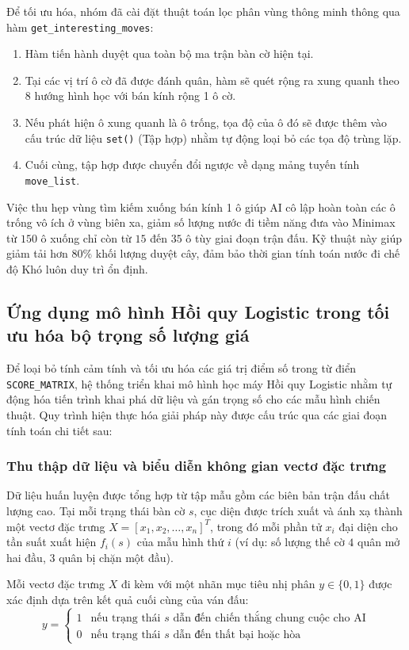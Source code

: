 Để tối ưu hóa, nhóm đã cài đặt thuật toán lọc phân vùng thông minh thông qua hàm \texttt{get\_interesting\_moves}:
\begin{enumerate}
	\item Hàm tiến hành duyệt qua toàn bộ ma trận bàn cờ hiện tại.
	\item Tại các vị trí ô cờ đã được đánh quân, hàm sẽ quét rộng ra xung quanh theo 8 hướng hình học với bán kính rộng 1 ô cờ.
	\item Nếu phát hiện ô xung quanh là ô trống, tọa độ của ô đó sẽ được thêm vào cấu trúc dữ liệu \texttt{set()} (Tập hợp) nhằm tự động loại bỏ các tọa độ trùng lặp.
	\item Cuối cùng, tập hợp được chuyển đổi ngược về dạng mảng tuyến tính \texttt{move\_list}.
\end{enumerate}
Việc thu hẹp vùng tìm kiếm xuống bán kính 1 ô giúp AI cô lập hoàn toàn các ô trống vô ích ở vùng biên xa, giảm số lượng nước đi tiềm năng đưa vào Minimax từ $150$ ô xuống chỉ còn từ $15$ đến $35$ ô tùy giai đoạn trận đấu. Kỹ thuật này giúp giảm tải hơn $80\%$ khối lượng duyệt cây, đảm bảo thời gian tính toán nước đi chế độ Khó luôn duy trì ổn định.

\subsection{Ứng dụng mô hình Hồi quy Logistic trong tối ưu hóa bộ trọng số lượng giá}

Để loại bỏ tính cảm tính và tối ưu hóa các giá trị điểm số trong từ điển \texttt{SCORE\_MATRIX}, hệ thống triển khai mô hình học máy Hồi quy Logistic nhằm tự động hóa tiến trình khai phá dữ liệu và gán trọng số cho các mẫu hình chiến thuật. Quy trình hiện thực hóa giải pháp này được cấu trúc qua các giai đoạn tính toán chi tiết sau:

\subsubsection{Thu thập dữ liệu và biểu diễn không gian vectơ đặc trưng}
Dữ liệu huấn luyện được tổng hợp từ tập mẫu gồm các biên bản trận đấu chất lượng cao. Tại mỗi trạng thái bàn cờ $s$, cục diện được trích xuất và ánh xạ thành một vectơ đặc trưng $X = [x_1, x_2, \dots, x_n]^T$, trong đó mỗi phần tử $x_i$ đại diện cho tần suất xuất hiện $f_i(s)$ của mẫu hình thứ $i$ (ví dụ: số lượng thế cờ $4$ quân mở hai đầu, $3$ quân bị chặn một đầu).

Mỗi vectơ đặc trưng $X$ đi kèm với một nhãn mục tiêu nhị phân $y \in \{0, 1\}$ được xác định dựa trên kết quả cuối cùng của ván đấu:
\begin{equation}
	y = \begin{cases} 
		1 & \text{nếu trạng thái } s \text{ dẫn đến chiến thắng chung cuộc cho AI} \\
		0 & \text{nếu trạng thái } s \text{ dẫn đến thất bại hoặc hòa}
	\end{cases}
\end{equation}

